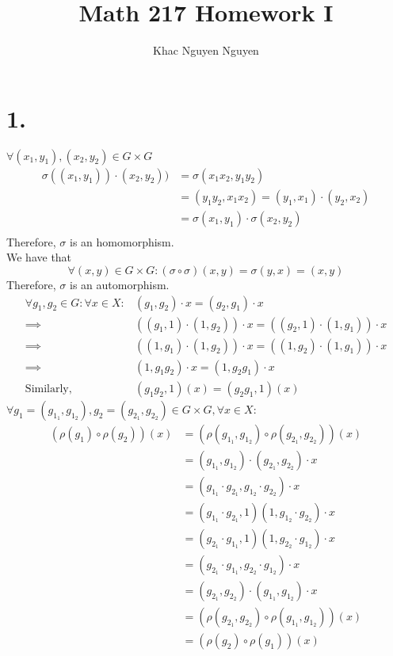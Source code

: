 \documentclass[11pt]{article}
\title{\textbf{Math 217 Homework I}}
\author{Khac Nguyen Nguyen}
\date{}
\begin{document}
\section*{1.}
$\forall (x_1,y_1), (x_2,y_2) \in G \times G$
\begin{equation*}
\begin{aligned}
\sigma((x_1,y_1)) \cdot (x_2,y_2)) &= \sigma(x_1x_2,y_1y_2) \\
&= (y_1y_2,x_1x_2) = (y_1,x_1) \cdot (y_2,x_2) \\
&=\sigma(x_1,y_1) \cdot \sigma(x_2,y_2) \\ 
\end{aligned}
\end{equation*}
Therefore, $\sigma$ is an homomorphism. \\
We have that 
\[
\forall (x,y) \in G \times G: (\sigma \circ \sigma)(x,y) = \sigma(y,x) = (x,y)
\]
Therefore, $\sigma$ is an automorphism.
\begin{equation*}
\begin{aligned}
\forall g_1,g_2 \in G: \forall x \in X: &(g_1,g_2) \cdot x = (g_2,g_1) \cdot x \\
\implies & ((g_1,1) \cdot (1, g_2) )\cdot x = ((g_2,1) \cdot (1, g_1) )\cdot x \\
\implies & ((1,g_1) \cdot (1, g_2) )\cdot x = ((1,g_2) \cdot (1, g_1) )\cdot x \\
\implies & (1,g_1g_2) \cdot x = (1,g_2g_1) \cdot x \\
\text {Similarly,} &(g_1g_2,1)(x) = (g_2g_1,1)(x) 
\end{aligned}
\end{equation*}
$\forall g_1 = (g_{1_1}, g_{1_2}), g_2 = (g_{2_1}, g_{2_2}) \in G \times G, \forall x \in X:$
\begin{equation*}
\begin{aligned}
(\rho(g_1) \circ \rho(g_2)) (x) &=(\rho(g_{1_1}, g_{1_2}) \circ \rho(g_{2_1}, g_{2_2}))(x) \\
&= (g_{1_1}, g_{1_2}) \cdot (g_{2_1}, g_{2_2}) \cdot x \\
&= (g_{1_1} \cdot g_{2_1}, g_{1_2} \cdot g_{2_2}) \cdot x \\
&= (g_{1_1} \cdot g_{2_1},1) (1, g_{1_2} \cdot g_{2_2}) \cdot x \\
&= (g_{2_1} \cdot g_{1_1},1) (1, g_{2_2} \cdot g_{1_2}) \cdot x \\
&= (g_{2_1} \cdot g_{1_1}, g_{2_2} \cdot g_{1_2}) \cdot x \\
&= (g_{2_1}, g_{2_2}) \cdot (g_{1_1}, g_{1_2}) \cdot x \\
&=(\rho(g_{2_1}, g_{2_2}) \circ \rho(g_{1_1}, g_{1_2}))(x) \\
&= (\rho(g_2) \circ \rho(g_1)) (x)
\end{aligned}
\end{equation*}
\pagebreak
\end{document}
